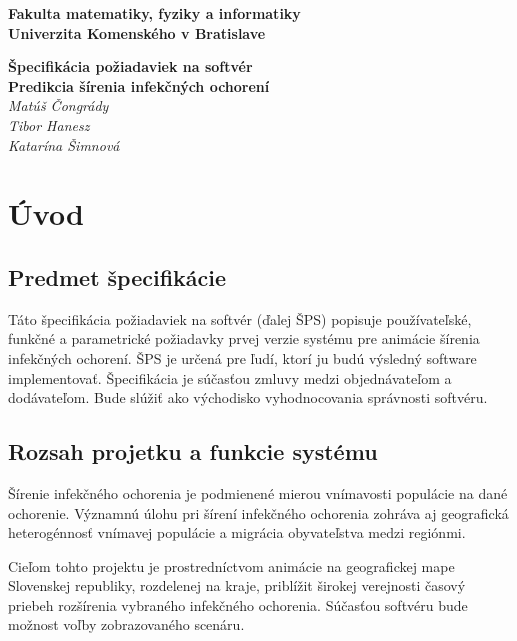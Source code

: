 \documentclass[12pt,a4paper]{report}
\begin{document}
\begin{titlepage}
\centering\bfseries
		Fakulta matematiky, fyziky a informatiky\\Univerzita Komenského v Bratislave	

	\fontsize{23}{28}\textbf{Špecifikácia požiadaviek na softvér}\\
	\fontsize{16}{22}\textbf{Predikcia šírenia infekčných ochorení}\\
	\large\textit{Matúš Čongrády\\Tibor Hanesz\\Katarína Šimnová}

\end{titlepage}\bigskip
	\setcounter{tocdepth}{9}
	\tableofcontents

\renewcommand{\chaptername}{}	
\chapter[Úvod]{\rmfamily\bfseries
	Úvod}


\section[Predmet špecifikácie]{\rmfamily\bfseries
	Predmet špecifikácie}
Táto špecifikácia požiadaviek na softvér (ďalej ŠPS) popisuje používateľské, funkčné a parametrické požiadavky prvej verzie systému pre animácie šírenia infekčných ochorení. ŠPS je určená pre ľudí, ktorí ju budú výsledný software implementovať. Špecifikácia je súčasťou zmluvy medzi objednávateľom a dodávateľom. Bude slúžiť ako východisko vyhodnocovania správnosti softvéru.

\section[Rozsah projetku a funkcie systému]{\rmfamily\bfseries
	Rozsah projetku a funkcie systému}
Šírenie infekčného ochorenia je podmienené mierou vnímavosti populácie na dané ochorenie. Významnú úlohu pri šírení infekčného ochorenia zohráva aj geografická heterogénnosť vnímavej populácie a migrácia obyvateľstva medzi regiónmi.\par

Cieľom tohto projektu je prostredníctvom animácie na geografickej mape Slovenskej republiky, rozdelenej na kraje, priblížit širokej verejnosti časový priebeh rozšírenia vybraného infekčného ochorenia. Súčasťou softvéru bude možnost voľby zobrazovaného scenáru.  \par
\end{document}
